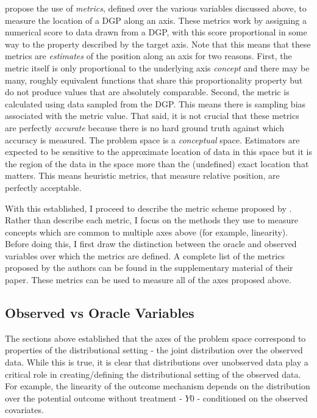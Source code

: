 \documentclass[../main.tex]{subfiles}
\begin{document}
\cite{Dorie2019Automated1} propose the use of \textit{metrics}, defined over the various variables discussed above, to measure the location of a DGP along an axis. These metrics work by assigning a numerical score to data drawn from a DGP, with this score proportional in some way to the property described by the target axis. Note that this means that these metrics are \textit{estimates} of the position along an axis for two reasons. First, the metric itself is only proportional to the underlying axis \textit{concept} and there may be many, roughly equivalent functions that share this proportionality property but do not produce values that are  absolutely comparable. Second, the metric is calculated using data sampled from the DGP. This means there is sampling bias associated with the metric value. That said, it is not crucial that these metrics are perfectly \textit{accurate} because there is no hard ground truth against which accuracy is measured. The problem space is a \textit{conceptual} space. Estimators are expected to be sensitive to the approximate location of data in this space but it is the region of the data in the space more than the (undefined) exact location that matters. This means heuristic metrics, that measure relative position, are perfectly acceptable.

\vspace{\baselineskip}

With this established, I proceed to describe the metric scheme proposed by \cite{Dorie2019Automated1}. Rather than describe each metric, I focus on the methods they use to measure concepts which are common to multiple axes above (for example, linearity). Before doing this, I first draw the distinction between the oracle and observed variables over which the metrics are defined. A complete list of the metrics proposed by the authors can be found in the supplementary material of their paper. These metrics can be used to measure all of the axes proposed above.

\subsection{Observed vs Oracle Variables}

The sections above established that the axes of the problem space correspond to properties of the distributional setting - the joint distribution over the observed data. While this is true, it is clear that distributions over unobserved data play a critical role in creating/defining the distributional setting of the observed data. For example, the linearity of the outcome mechanism depends on the distribution over the potential outcome without treatment - $Y0$ - conditioned on the observed covariates.
\end{document}
